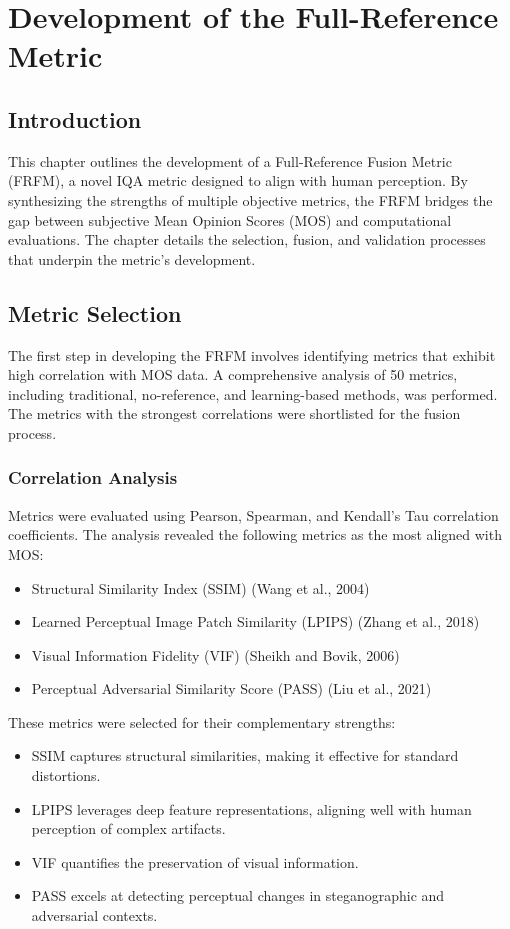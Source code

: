 \chapter{Development of the Full-Reference Metric}

\section{Introduction}

This chapter outlines the development of a Full-Reference Fusion Metric (FRFM), a novel IQA metric designed to align with human perception. By synthesizing the strengths of multiple objective metrics, the FRFM bridges the gap between subjective Mean Opinion Scores (MOS) and computational evaluations. The chapter details the selection, fusion, and validation processes that underpin the metric's development.

\section{Metric Selection}

The first step in developing the FRFM involves identifying metrics that exhibit high correlation with MOS data. A comprehensive analysis of 50 metrics, including traditional, no-reference, and learning-based methods, was performed. The metrics with the strongest correlations were shortlisted for the fusion process.

\subsection{Correlation Analysis}

Metrics were evaluated using Pearson, Spearman, and Kendall’s Tau correlation coefficients. The analysis revealed the following metrics as the most aligned with MOS:
\begin{itemize}
    \item Structural Similarity Index (SSIM) (Wang et al., 2004)
    \item Learned Perceptual Image Patch Similarity (LPIPS) (Zhang et al., 2018)
    \item Visual Information Fidelity (VIF) (Sheikh and Bovik, 2006)
    \item Perceptual Adversarial Similarity Score (PASS) (Liu et al., 2021)
\end{itemize}

These metrics were selected for their complementary strengths:
\begin{itemize}
    \item SSIM captures structural similarities, making it effective for standard distortions.
    \item LPIPS leverages deep feature representations, aligning well with human perception of complex artifacts.
    \item VIF quantifies the preservation of visual information.
    \item PASS excels at detecting perceptual changes in steganographic and adversarial contexts.
\end{itemize}

